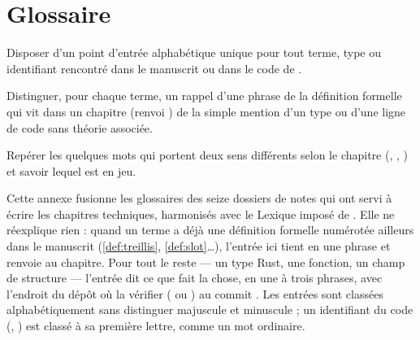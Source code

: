 \chapter{Glossaire}
\label{chap:glossaire}

\begin{objectifs}
  \item Disposer d'un point d'entrée alphabétique unique pour tout terme, type ou identifiant rencontré dans le manuscrit ou dans le code de \reactant{}.
  \item Distinguer, pour chaque terme, un rappel d'une phrase de la définition formelle qui vit dans un chapitre (renvoi ) de la simple mention d'un type ou d'une ligne de code sans théorie associée.
  \item Repérer les quelques mots qui portent deux sens différents selon le chapitre (, , ) et savoir lequel est en jeu.
\end{objectifs}


Cette annexe fusionne les glossaires des seize dossiers de notes qui ont
servi à écrire les chapitres techniques, harmonisés avec le \og Lexique
imposé\fg{} de . Elle ne réexplique rien : quand un terme a déjà
une définition formelle numérotée ailleurs dans le manuscrit
(\cref{def:treillis}, \cref{def:slot}\ldots), l'entrée ici tient en une phrase
et renvoie au chapitre. Pour tout le reste — un type Rust, une fonction, un
champ de structure — l'entrée dit ce que fait la chose, en une à trois
phrases, avec l'endroit du dépôt où la vérifier ( ou
) au commit \code{\snapshotCommit}. Les entrées
sont classées alphabétiquement sans distinguer majuscule et minuscule ; un
identifiant du code (, ) est classé à sa
première lettre, comme un mot ordinaire.

